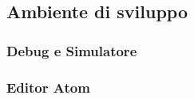	\subsection{Ambiente di sviluppo}
		
		\subsubsection{Debug e Simulatore}
	
		\subsubsection{Editor Atom}
		

